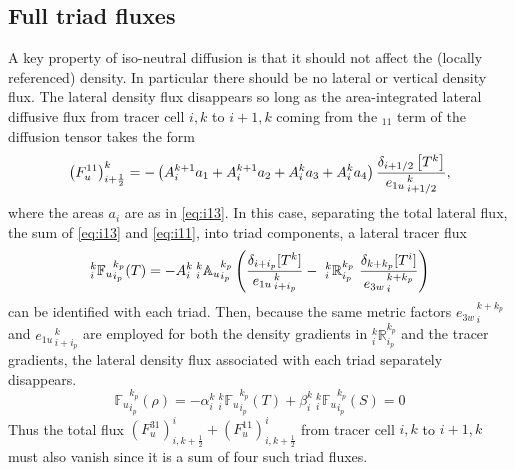 \documentclass[../tex_main/NEMO_manual]{subfiles}
\begin{document}
\subsection{Full triad fluxes}
A key property of iso-neutral diffusion is that it should not affect the (locally referenced) density.
In particular there should be no lateral or vertical density flux.
The lateral density flux disappears so long as the area-integrated lateral diffusive flux from
tracer cell $i,k$ to $i+1,k$ coming from the $_{11}$ term of the diffusion tensor takes the form
\begin{equation}
  \label{eq:i11}
  \left( F_u^{11} \right) _{i+\frac{1}{2}} ^{k} =
  - \left( {A}_i^{k+1} a_{1} + {A}_i^{k+1} a_{2} + {A}_i^k
    a_{3} + {A}_i^k a_{4} \right)
  \frac{\delta_{i+1/2} \left[ T^k\right]}{{e_{1u}}_{\,i+1/2}^{\,k}},
\end{equation}
where the areas $a_i$ are as in \autoref{eq:i13}.
In this case, separating the total lateral flux, the sum of \autoref{eq:i13} and \autoref{eq:i11},
into triad components, a lateral tracer flux
\begin{equation}
  \label{eq:latflux-triad}
  _i^k {\mathbb{F}_u}_{i_p}^{k_p} (T) = - {A}_i^k{ \:}_i^k{\mathbb{A}_u}_{i_p}^{k_p}
  \left(
    \frac{ \delta_{i+ i_p}[T^k] }{ {e_{1u}}_{\,i + i_p}^{\,k} }
    -\ {_i^k\mathbb{R}_{i_p}^{k_p}} \
    \frac{ \delta_{k+k_p} [T^i] }{{e_{3w}}_{\,i}^{\,k+k_p} }
  \right)
\end{equation}
can be identified with each triad.
Then, because the same metric factors ${e_{3w}}_{\,i}^{\,k+k_p}$ and ${e_{1u}}_{\,i+i_p}^{\,k}$ are employed for both
the density gradients in $ _i^k \mathbb{R}_{i_p}^{k_p}$ and the tracer gradients,
the lateral density flux associated with each triad separately disappears.
\begin{equation}
  \label{eq:latflux-rho}
  {\mathbb{F}_u}_{i_p}^{k_p} (\rho)=-\alpha _i^k {\:}_i^k {\mathbb{F}_u}_{i_p}^{k_p} (T) + \beta_i^k {\:}_i^k {\mathbb{F}_u}_{i_p}^{k_p} (S)=0
\end{equation}
Thus the total flux $\left( F_u^{31} \right) ^i _{i,k+\frac{1}{2}} + \left( F_u^{11} \right) ^i _{i,k+\frac{1}{2}}$ from
tracer cell $i,k$ to $i+1,k$ must also vanish since it is a sum of four such triad fluxes.
\end{document}
